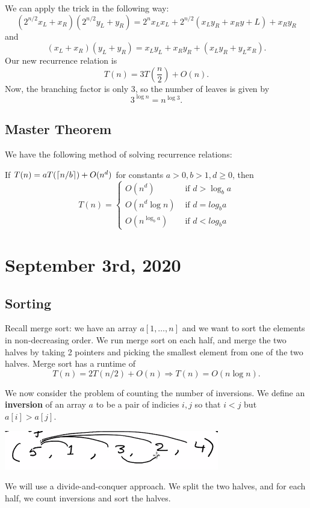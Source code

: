 \documentclass[11pt]{scrartcl}
\DeclarePairedDelimiter\ceil{\lceil}{\rceil}
\begin{document}
We can apply the trick in the following way:
$$(2^{n/2}x_L + x_R)(2^{n/2}y_L + y_R) = 2^n x_Lx_L + 2^{n/2}(x_Ly_R + x_Ry+L) + x_Ry_R$$
and $$(x_L+x_R)(y_L+y_R) = x_Ly_L + x_Ry_R + (x_Ly_R+y_Lx_R).$$
Our new recurrence relation is
$$T(n) = 3T\left (\frac{n}{2}\right ) + O(n).$$
Now, the branching factor is only $3$, so the number of leaves is given by $$3^{\log n} = n^{\log 3}.$$

\subsection{Master Theorem}
We have the following method of solving recurrence relations:
\begin{thm} If $T(n) = aT(\ceil{n/b}) + O(n^d)$ for constants $a > 0, b > 1, d \ge 0$, then
$$T(n) = \begin{cases}
O(n^d) & \text{ if } d > \log_b a \\ 
O(n^d \log n) & \text{ if } d = log_b a \\
O(n^{\log_b a}) & \text{ if } d < log_b a
\end{cases}$$
\end{thm}
\pagebreak
\section{September 3rd, 2020}
\subsection{Sorting}
Recall merge sort: we have an array $a[1, \dots, n]$ and we want to sort the elements in non-decreasing order.  We run merge sort on each half, and merge the two halves by taking 2 pointers and picking the smallest element from one of the two halves.  Merge sort has a runtime of 
$$T(n) = 2T(n/2) + O(n) \Rightarrow T(n) = O(n \log n).$$

We now consider the problem of counting the number of inversions.  We define an \textbf{inversion} of an array $a$ to be a pair of indicies $i, j$ so that $i < j$ but $a[i] > a[j]$.  
\begin{center}
\includegraphics[scale=1]{inversion.png}
\end{center}
We will use a divide-and-conquer approach.  We split the two halves, and for each half, we count inversions and sort the halves.  
\end{document}
